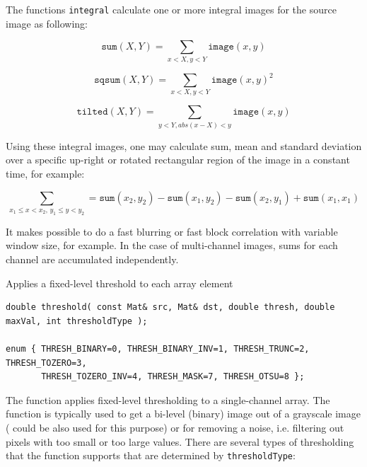 The functions \texttt{integral} calculate one or more integral images for the source image as following:

\[
\texttt{sum}(X,Y) = \sum_{x<X,y<Y} \texttt{image}(x,y)
\]

\[
\texttt{sqsum}(X,Y) = \sum_{x<X,y<Y} \texttt{image}(x,y)^2
\]

\[
\texttt{tilted}(X,Y) = \sum_{y<Y,abs(x-X)<y} \texttt{image}(x,y)
\]

Using these integral images, one may calculate sum, mean and standard deviation over a specific up-right or rotated rectangular region of the image in a constant time, for example:

\[
\sum_{x_1\leq x < x_2, \, y_1 \leq y < y_2} = \texttt{sum}(x_2,y_2)-\texttt{sum}(x_1,y_2)-\texttt{sum}(x_2,y_1)+\texttt{sum}(x_1,x_1)
\]

It makes possible to do a fast blurring or fast block correlation with variable window size, for example. In the case of multi-channel images, sums for each channel are accumulated independently.


\label{threshold}
Applies a fixed-level threshold to each array element

\begin{lstlisting}
double threshold( const Mat& src, Mat& dst, double thresh, double maxVal, int thresholdType );

enum { THRESH_BINARY=0, THRESH_BINARY_INV=1, THRESH_TRUNC=2, THRESH_TOZERO=3,
       THRESH_TOZERO_INV=4, THRESH_MASK=7, THRESH_OTSU=8 };
\end{lstlisting}
\begin{description}
\end{description}

The function applies fixed-level thresholding
to a single-channel array. The function is typically used to get a
bi-level (binary) image out of a grayscale image ( could
be also used for this purpose) or for removing a noise, i.e. filtering
out pixels with too small or too large values. There are several
types of thresholding that the function supports that are determined by
\texttt{thresholdType}:

